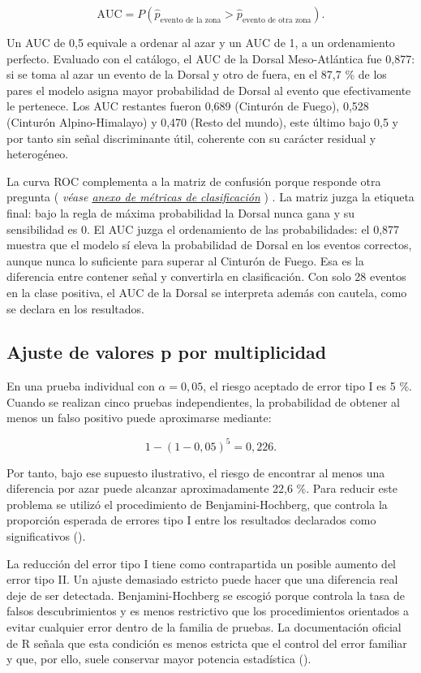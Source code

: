 \documentclass[
  spanish,
  letterpaper,
  DIV=11,
  numbers=noendperiod]{scrartcl}
\newcommand{\asesoriaParenRef}[1]{%
  \textnormal{\textcolor{asesoriaTextColor}{(}}%
  {\hypersetup{linkcolor=asesoriaLinkColor,urlcolor=asesoriaLinkColor,citecolor=asesoriaLinkColor}\textcolor{asesoriaTextColor}{\emph{#1}}}%
  \textnormal{\textcolor{asesoriaTextColor}{)}}%
}
\begin{document}
\[
\text{AUC}=P\!\left(\hat p_{\text{evento de la zona}} > \hat p_{\text{evento de otra zona}}\right).
\]

Un AUC de 0,5 equivale a ordenar al azar y un AUC de 1, a un
ordenamiento perfecto. Evaluado con el catálogo, el AUC de la Dorsal
Meso-Atlántica fue 0,877: si se toma al azar un evento de la Dorsal y
otro de fuera, en el 87,7 \% de los pares el modelo asigna mayor
probabilidad de Dorsal al evento que efectivamente le pertenece. Los AUC
restantes fueron 0,689 (Cinturón de Fuego), 0,528 (Cinturón
Alpino-Himalayo) y 0,470 (Resto del mundo), este último bajo 0,5 y por
tanto sin señal discriminante útil, coherente con su carácter residual y
heterogéneo.

La curva ROC complementa a la matriz de confusión porque responde otra
pregunta
\asesoriaParenRef{véase \hyperref[sec-anexo-metricas-clasificacion]{anexo de métricas de clasificación}}.
La matriz juzga la etiqueta final: bajo la regla de máxima probabilidad
la Dorsal nunca gana y su sensibilidad es 0. El AUC juzga el
ordenamiento de las probabilidades: el 0,877 muestra que el modelo sí
eleva la probabilidad de Dorsal en los eventos correctos, aunque nunca
lo suficiente para superar al Cinturón de Fuego. Esa es la diferencia
entre contener señal y convertirla en clasificación. Con solo 28 eventos
en la clase positiva, el AUC de la Dorsal se interpreta además con
cautela, como se declara en los resultados.

\subsection{Ajuste de valores p por
multiplicidad}\label{sec-anexo-ajuste-p}

En una prueba individual con \(\alpha=0{,}05\), el riesgo aceptado de
error tipo I es 5 \%. Cuando se realizan cinco pruebas independientes,
la probabilidad de obtener al menos un falso positivo puede aproximarse
mediante:

\[
1-(1-0{,}05)^5=0{,}226.
\]

Por tanto, bajo ese supuesto ilustrativo, el riesgo de encontrar al
menos una diferencia por azar puede alcanzar aproximadamente 22,6 \%.
Para reducir este problema se utilizó el procedimiento de
Benjamini-Hochberg, que controla la proporción esperada de errores tipo
I entre los resultados declarados como significativos
().

La reducción del error tipo I tiene como contrapartida un posible
aumento del error tipo II. Un ajuste demasiado estricto puede hacer que
una diferencia real deje de ser detectada. Benjamini-Hochberg se escogió
porque controla la tasa de falsos descubrimientos y es menos restrictivo
que los procedimientos orientados a evitar cualquier error dentro de la
familia de pruebas. La documentación oficial de R señala que esta
condición es menos estricta que el control del error familiar y que, por
ello, suele conservar mayor potencia estadística
().
\end{document}

